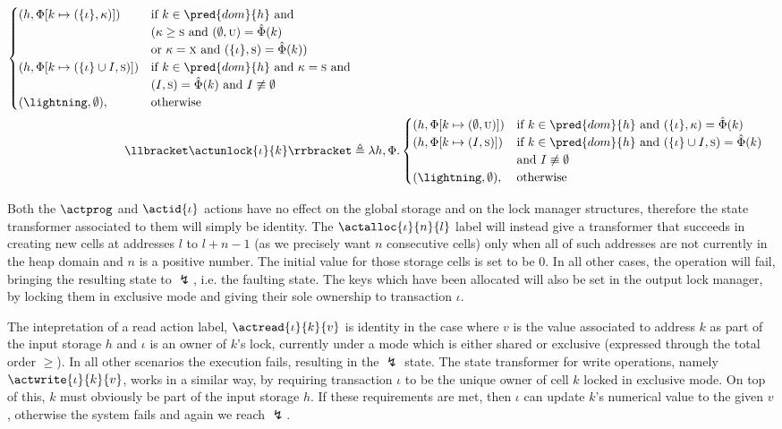 \begin{defn}
\begin{align*}
\begin{cases}
	(h, \Phi[k \mapsto (\{\iota\}, \kappa)]) & \text{if } k \in \pred{dom}{h} \text{ and} \\ & ( \kappa \geq \textsc{s} \text{ and } (\emptyset, \textsc{u}) = \hat{\Phi}(k) \\
	& \text{or } \kappa = \textsc{x} \text{ and } (\{\iota\}, \textsc{s}) = \hat{\Phi}(k) ) \\
	(h, \Phi[k \mapsto (\{\iota\} \cup I, \textsc{s})]) & \text{if } k \in \pred{dom}{h} \text{ and } \kappa = \textsc{s} \text{ and} \\ & (I, \textsc{s}) = \hat{\Phi}(k)
	\text{ and } I \not\equiv \emptyset \\
	(\lightning, \emptyset), & \text{otherwise}
	\end{cases} \\
	\llbracket \actunlock{\iota}{k} \rrbracket &\triangleq \lambda h, \Phi \ldotp
	\begin{cases}
	(h, \Phi[k \mapsto (\emptyset, \textsc{u})]) & \text{if } k \in \pred{dom}{h} \text{ and } (\{\iota\}, \kappa) = \hat{\Phi}(k) \\
	(h, \Phi[k \mapsto (I, \textsc{s})]) & \text{if } k \in \pred{dom}{h} \text{ and } (\{\iota\} \cup I, \textsc{s}) = \hat{\Phi}(k) \\ & \text{and } I \not\equiv \emptyset \\
	(\lightning, \emptyset), & \text{otherwise}
	\end{cases}
	\end{align*}
\end{defn}
Both the $\actprog$ and $\actid{\iota}$ actions have no effect on the global storage and on the lock manager structures, therefore the state transformer associated to them will simply be identity. The $\actalloc{\iota}{n}{l}$ label will instead give a transformer that succeeds in creating new cells at addresses $l$ to $l + n - 1$ (as we precisely want $n$ consecutive cells) only when all of such addresses are not currently in the heap domain and $n$ is a positive number. The initial value for those storage cells is set to be $0$. In all other cases, the operation will fail, bringing the resulting state to $\lightning$, i.e. the faulting state. The keys which have been allocated will also be set in the output lock manager, by locking them in exclusive mode and giving their sole ownership to transaction $\iota$.

The intepretation of a read action label, $\actread{\iota}{k}{v}$ is identity in the case where $v$ is the value associated to address $k$ as part of the input storage $h$ and $\iota$ is an owner of $k$'s lock, currently under a mode which is either shared or exclusive (expressed through the total order $\geq$). In all other scenarios the execution fails, resulting in the $\lightning$ state. The state transformer for write operations, namely $\actwrite{\iota}{k}{v}$, works in a similar way, by requiring transaction $\iota$ to be the unique owner of cell $k$ locked in exclusive mode. On top of this, $k$ must obviously be part of the input storage $h$. If these requirements are met, then $\iota$ can update $k$'s numerical value to the given $v$, otherwise the system fails and again we reach $\lightning$.


